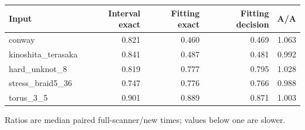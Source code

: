 \begin{center}
\begin{tabular}{@{}lrrrr@{}}
\toprule
Input & Interval exact & Fitting exact & Fitting decision & A/A \\
\midrule
conway & 0.821 & 0.460 & 0.469 & 1.063 \\
kinoshita\_terasaka & 0.841 & 0.487 & 0.481 & 0.992 \\
hard\_unknot\_8 & 0.819 & 0.777 & 0.795 & 1.028 \\
stress\_braid5\_36 & 0.747 & 0.776 & 0.766 & 0.988 \\
torus\_3\_5 & 0.901 & 0.889 & 0.871 & 1.003 \\
\bottomrule
\end{tabular}
\end{center}
Ratios are median paired full-scanner/new times; values below one are slower.
